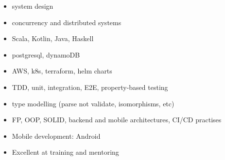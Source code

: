 \setlength{\columnsep}{-1.0cm}
 \begin{multicols}{2}
    \begin{itemize}
      \item system design
      \item concurrency and distributed systems 
	    \item Scala, Kotlin, Java, Haskell
        \item postgresql, dynamoDB
        \item AWS, k8s, terraform, helm charts 
	    \item TDD, unit, integration, E2E, property-based testing %
      \item type modelling (parse not validate, isomorphisms, etc)
	    \item FP, OOP, SOLID, backend and mobile architectures,
	    CI/CD practises 
        \item Mobile development: Android 
	    \item Excellent at training and mentoring 
    \end{itemize}
 \end{multicols}
